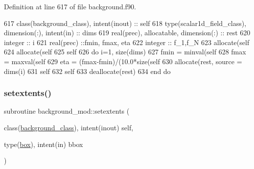 Definition at line 617 of file background.\+f90.


\begin{DoxyCode}
617     \textcolor{keywordtype}{class}(background\_class), \textcolor{keywordtype}{intent(inout)} :: self
618     \textcolor{keywordtype}{type}(scalar1d\_field\_class), \textcolor{keywordtype}{dimension(:)}, \textcolor{keywordtype}{intent(in)} :: dims
619     \textcolor{keywordtype}{real(prec)}, \textcolor{keywordtype}{allocatable}, \textcolor{keywordtype}{dimension(:)} :: rest
620     \textcolor{keywordtype}{integer} :: i
621     \textcolor{keywordtype}{real(prec)} ::fmin, fmax, eta
622     \textcolor{keywordtype}{integer} :: f\_1,f\_N
623     \textcolor{keyword}{allocate}(self%
624     \textcolor{keyword}{allocate}(self%
625     self%
626     \textcolor{keywordflow}{do} i=1, \textcolor{keyword}{size}(dims)
627         fmin = minval(self%
628         fmax = maxval(self%
629         eta = (fmax-fmin)/(10.0*\textcolor{keyword}{size}(self%
630         \textcolor{keyword}{allocate}(rest, source = dims(i)%
631         self%
632         self%
633         \textcolor{keyword}{deallocate}(rest)
634 \textcolor{keywordflow}{    end do}
\end{DoxyCode}
\mbox{\label{namespacebackground__mod_ae8871564866fdd657a25f6a5a2256c33}} 
\subsubsection{\texorpdfstring{setextents()}{setextents()}}
{\footnotesize\ttfamily subroutine background\+\_\+mod\+::setextents (\begin{DoxyParamCaption}\item[{class(\mbox{\hyperlink{structbackground__mod_1_1background__class}{background\+\_\+class}}), intent(inout)}]{self,  }\item[{type(\mbox{\hyperlink{structgeometry__mod_1_1box}{box}}), intent(in)}]{bbox }\end{DoxyParamCaption})\hspace{0.3cm}{\ttfamily [private]}}



